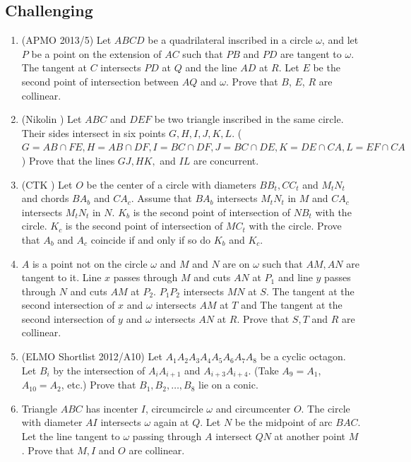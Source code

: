 \documentclass[11pt,paper=letter]{scrartcl}
\begin{document}
\subsection{Challenging}

\begin{enumerate}

\item (APMO 2013/5) Let $ABCD$ be a quadrilateral inscribed in a circle $\omega$, and let $P$ be a point on the extension of $AC$ such that $PB$ and $PD$ are tangent to $\omega$. The tangent at $C$ intersects $PD$ at $Q$ and the line $AD$ at $R$. Let $E$ be the second point of intersection between $AQ$ and $\omega$. Prove that $B$, $E$, $R$ are collinear.

\item (Nikolin \cite{CTK7}) Let $ABC$ and $DEF$ be two triangle inscribed in the same circle. Their sides intersect in six points $G,H,I,J,K,L$. ($G = AB \cap FE, H = AB \cap DF, I = BC \cap DF, J = BC \cap DE, K = DE \cap CA, L = EF \cap CA$) Prove that the lines $GJ, HK,$ and $IL$ are concurrent.

\item (CTK \cite{CTK6}) Let $O$ be the center of a circle with diameters $BB_t, CC_t$ and $M_tN_t$ and chords $BA_b$ and $CA_c$. Assume that $BA_b$ intersects $M_tN_t$ in $M$ and $CA_c$ intersects $M_tN_t$ in $N$. $K_b$ is the second point of intersection of $NB_t$ with the circle. $K_c$ is the second point of intersection of $MC_t$ with the circle. Prove that $A_b$ and $A_c$ coincide if and only if so do $K_b$ and $K_c$.

\item $A$ is a point not on the circle $\omega$ and $M$ and $N$ are on $\omega$ such that $AM,AN$ are tangent to it. Line $x$ passes through $M$ and cuts $AN$ at $P_{1}$ and line $y$ passes through $N$ and cuts $AM$ at $P_{2}$. $P_{1}P_{2}$ intersects $MN$ at $S$. The tangent at the second intersection of $x$ and $\omega$ intersects $AM$ at $T$ and The tangent at the second intersection of $y$ and $\omega$ intersects $AN$ at $R$. Prove that $S,T$ and $R$ are collinear.

\item (ELMO Shortlist 2012/A10) Let $A_1A_2A_3A_4A_5A_6A_7A_8$ be a cyclic octagon. Let $B_i$ by the intersection of $A_iA_{i+1}$ and $A_{i+3}A_{i+4}$. (Take $A_9 = A_1$, $A_{10} = A_2$, etc.) Prove that $B_1, B_2, \ldots , B_8$ lie on a conic.

\item Triangle $ABC$ has incenter $I$, circumcircle $\omega$ and circumcenter $O$. The circle with diameter $AI$ intersects $\omega$ again at $Q$. Let $N$ be the midpoint of arc $BAC$. Let the line tangent to $\omega$ passing through $A$ intersect $QN$ at another point $M$. Prove that $M, I$ and $O$ are collinear.


\end{enumerate}
\end{document}
